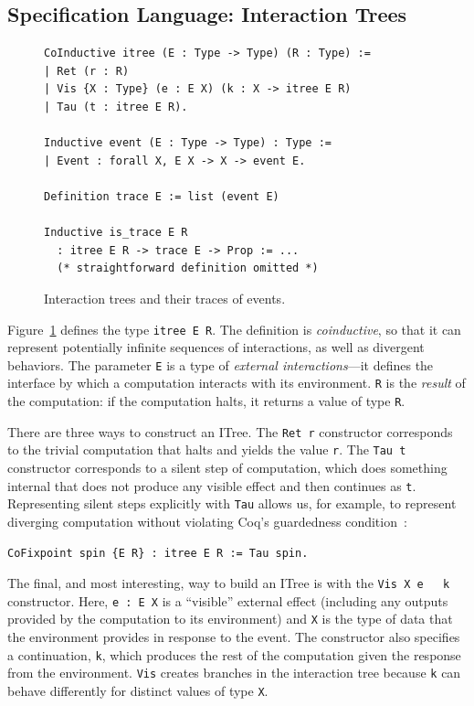 \documentclass{article}
\newcommand{\ilc}[1]{\lstinline[style=customcoq]{#1}}
\theoremstyle{definition}
\begin{document}
\subsection{Specification Language: Interaction Trees}

\begin{figure}
  \begin{lstlisting}[style=customcoq]
CoInductive itree (E : Type -> Type) (R : Type) :=
| Ret (r : R)
| Vis {X : Type} (e : E X) (k : X -> itree E R)
| Tau (t : itree E R).

Inductive event (E : Type -> Type) : Type :=
| Event : forall X, E X -> X -> event E.

Definition trace E := list (event E)

Inductive is_trace E R
  : itree E R -> trace E -> Prop := ...
  (* straightforward definition omitted *)
 \end{lstlisting}
  \caption{Interaction trees and their traces of events.}
  \label{fig:itrees}
\end{figure}

Figure~\ref{fig:itrees} defines the type \ilc{itree E R}.  The definition is
\textit{coinductive}, so that it can represent potentially infinite sequences of
interactions, as well as divergent behaviors.  The parameter \ilc{E} is a type
of \textit{external interactions}---it defines the interface by which a
computation interacts with its environment.  \ilc{R} is the \textit{result} of
the computation: if the computation halts, it returns a value of type \ilc{R}.

There are three ways to construct an ITree. The \ilc{Ret r} constructor
corresponds to the trivial computation that halts and yields the value
\ilc{r}. The \ilc{Tau t} constructor corresponds to a silent step of
computation, which does something internal that does not produce any visible
effect and then continues as \ilc{t}.  Representing silent steps explicitly with
\ilc{Tau} allows us, for example, to represent diverging computation without
violating Coq's guardedness condition~\cite{coinduction}:

\begin{lstlisting}[style=customcoq]
CoFixpoint spin {E R} : itree E R := Tau spin.
\end{lstlisting}

The final, and most interesting, way to build an ITree is with the \ilc{Vis X e
  k} constructor.  Here, \ilc{e : E X} is a ``visible'' external effect
(including any outputs provided by the computation to its environment) and
\ilc{X} is the type of data that the environment provides in response to the
event.  The constructor also specifies a continuation, \ilc{k}, which produces
the rest of the computation given the response from the environment.  \ilc{Vis}
creates branches in the interaction tree because \ilc{k} can behave differently
for distinct values of type \ilc{X}.
\end{document}
